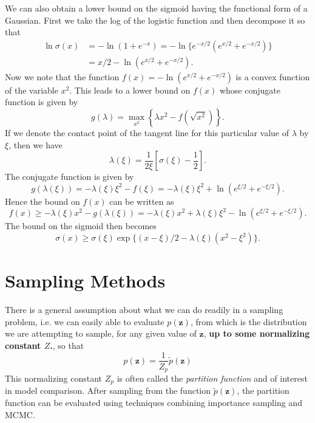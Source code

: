 \documentclass[a4paper]{book}
\renewcommand{\bf}{\mathbf}
\newcommand{\imp}[1]{\textit{#1}}
\begin{document}
We can also obtain a lower bound on the sigmoid having the functional form of a Gaussian. First we take the log of the logistic function and then decompose it so that
\begin{align}
	\ln \sigma(x) &= -\ln(1 + e^{-x}) = -\ln \{ e^{-x/2}(e^{x/2}+e^{-x/2}) \}\\
	&= x/2 - \ln(e^{x/2}+e^{-x/2}).
\end{align}
Now we note that the function $f(x) = -\ln (e^{x/2}+e^{-x/2})$ is a convex function of the variable $x^2$. This leads to a lower bound on $f(x)$ whose conjugate function is given by
\begin{equation}
	g(\lambda) = \max_{x^2} \left\{ \lambda x^2 - f\left( \sqrt{x^2} \right) \right\}.
\end{equation}
If we denote the contact point of the tangent line for this particular value of $\lambda$ by $\xi$, then we have
\begin{equation}
	\lambda (\xi) = \frac{1}{2\xi} \left[ \sigma(\xi) - \frac{1}{2} \right].
\end{equation}
The conjugate function is given by
\begin{equation}
	g(\lambda(\xi)) = -\lambda(\xi) \xi^2 - f(\xi) = -\lambda(\xi) \xi^2 + \ln (e^{\xi /2}+e^{-\xi/2}).
\end{equation}
Hence the bound on $f(x)$ can be written as
\begin{equation}
	f(x) \geq -\lambda (\xi) x^2 - g(\lambda(\xi)) = -\lambda(\xi)x^2 + \lambda(\xi) \xi^2 - \ln(e^{\xi/2}+e^{-\xi/2}).
\end{equation}
The bound on the sigmoid then becomes
\begin{equation}
	\sigma(x) \geq \sigma(\xi) \exp \{ (x-\xi)/2-\lambda(\xi)(x^2-\xi^2) \}.
\end{equation}
\section{Sampling Methods}
There is a general assumption about what we can do readily in a sampling problem, i.e. we can easily able to evaluate $p(\bf{z})$, from which is the distribution we are attempting to sample, for any given value of $\bf{z}$, \textbf{up to some normalizing constant $Z$.}, so that
\begin{equation}
	p(\bf{z}) = \frac{1}{Z_p} \tilde{p}(\bf{z})
\end{equation}
This normalizing constant $Z_p$ is often called the \imp{partition function} and of interest in model comparison. After sampling from the function $\tilde{p}(\bf{z})$, the partition function can be evaluated using techniques combining importance sampling and MCMC. 
\end{document}
